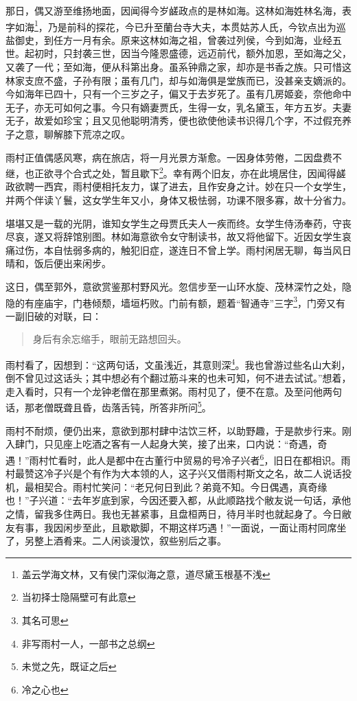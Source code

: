 \documentclass[12pt,oneside]{book}
\newenvironment{shici}{%
\begin{verse}%
\centering\large\hspace{12pt}}%
{\end{verse}}
\begin{document}
那日，偶又游至维扬地面，因闻得今岁鹾政点的是林如海。这林如海姓林名海，表字如海\footnote{盖云学海文林，又有侯门深似海之意，道尽黛玉根基不浅}，乃是前科的探花，今已升至蘭台寺大夫，本贯姑苏人氏，今钦点出为巡盐御史，到任方一月有余。原来这林如海之祖，曾袭过列侯，今到如海，业经五世。起初时，只封袭三世，因当今隆恩盛德，远迈前代，额外加恩，至如海之父，又袭了一代；至如海，便从科第出身。虽系钟鼎之家，却亦是书香之族。只可惜这林家支庶不盛，子孙有限；虽有几门，却与如海俱是堂族而已，没甚亲支嫡派的。今如海年已四十，只有一个三岁之子，偏又于去岁死了。虽有几房姬妾，奈他命中无子，亦无可如何之事。今只有嫡妻贾氏，生得一女，乳名黛玉，年方五岁。夫妻无子，故爱如珍宝；且又见他聪明清秀，便也欲使他读书识得几个字，不过假充养子之意，聊解膝下荒凉之叹。

雨村正值偶感风寒，病在旅店，将一月光景方渐愈。一因身体劳倦，二因盘费不继，也正欲寻个合式之处，暂且歇下\footnote{当初择士隐隔壁可有此意}。幸有两个旧友，亦在此境居住，因闻得鹾政欲聘一西宾，雨村便相托友力，谋了进去，且作安身之计。妙在只一个女学生，并两个伴读丫鬟，这女学生年又小，身体又极怯弱，功课不限多寡，故十分省力。

堪堪又是一载的光阴，谁知女学生之母贾氏夫人一疾而终。女学生侍汤奉药，守丧尽哀，遂又将辞馆别图。林如海意欲令女守制读书，故又将他留下。近因女学生哀痛过伤，本自怯弱多病的，触犯旧症，遂连日不曾上学。雨村闲居无聊，每当风日晴和，饭后便出来闲步。

这日，偶至郭外，意欲赏鉴那村野风光。忽信步至一山环水旋、茂林深竹之处，隐隐的有座庙宇，门巷倾颓，墙垣朽败。门前有额，题着“智通寺”三字\footnote{其名可思}，门旁又有一副旧破的对联，曰：

\begin{shici}
身后有余忘缩手，眼前无路想回头。
\end{shici}


雨村看了，因想到：“这两句话，文虽浅近，其意则深\footnote{非写雨村一人，一部书之总纲}。我也曾游过些名山大刹，倒不曾见过这话头；其中想必有个翻过筋斗来的也未可知，何不进去试试。”想着，走入看时，只有一个龙钟老僧在那里煮粥。雨村见了，便不在意。及至问他两句话，那老僧既聋且昏，齿落舌钝，所答非所问\footnote{未觉之先，既证之后}。

雨村不耐烦，便仍出来，意欲到那村肆中沽饮三杯，以助野趣，于是款步行来。刚入肆门，只见座上吃酒之客有一人起身大笑，接了出来，口内说：“奇遇，奇遇！”雨村忙看时，此人是都中在古董行中贸易的号冷子兴者\footnote{冷之心也}，旧日在都相识。雨村最赞这冷子兴是个有作为大本领的人，这子兴又借雨村斯文之名，故二人说话投机，最相契合。雨村忙笑问：“老兄何日到此？弟竟不知。今日偶遇，真奇缘也！”子兴道：“去年岁底到家，今因还要入都，从此顺路找个敝友说一句话，承他之情，留我多住两日。我也无甚紧事，且盘桓两日，待月半时也就起身了。今日敝友有事，我因闲步至此，且歇歇脚，不期这样巧遇！”一面说，一面让雨村同席坐了，另整上酒肴来。二人闲谈漫饮，叙些别后之事。
\end{document}
